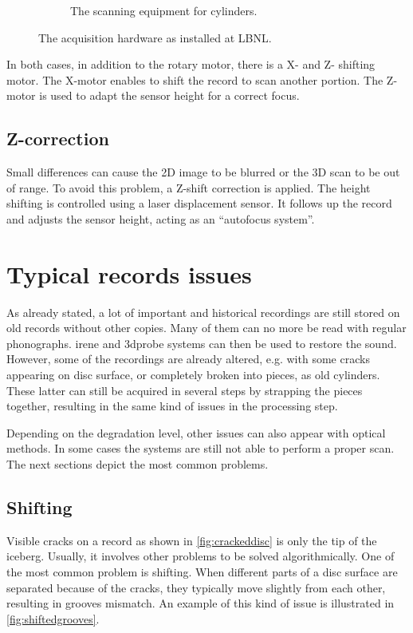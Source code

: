 \begin{figure}[!ht]
\begin{subfigure}[b]{0.49\textwidth}
    \caption{The scanning equipment for cylinders.}
    \label{fig:lab3d}
    \end{subfigure}
    \caption{The acquisition hardware as installed at LBNL.}
    \label{fig:labhw}
\end{figure}

In both cases, in addition to the rotary motor, there is a X- and Z- shifting motor. The X-motor enables to shift the record to scan another portion. The Z-motor is used to adapt the sensor height for a correct focus.

\subsection{Z-correction}
\label{sec:zcorr}

Small differences can cause the 2D image to be blurred or the 3D scan to be out of range. To avoid this problem, a Z-shift correction is applied. The height shifting is controlled using a laser displacement sensor. It follows up the record and adjusts the sensor height, acting as an ``autofocus system''.

\section{Typical records issues}

As already stated, a lot of important and historical recordings are still stored on old records without other copies. Many of them can no more be read with regular phonographs. \gls{irene} and \gls{3dprobe} systems can then be used to restore the sound. However, some of the recordings are already altered, e.g. with some cracks appearing on disc surface, or completely broken into pieces, as old cylinders. These latter can still be acquired in several steps by strapping the pieces together, resulting in the same kind of issues in the processing step.

Depending on the degradation level, other issues can also appear with optical methods. In some cases the systems are still not able to perform a proper scan. The next sections depict the most common problems.

\subsection{Shifting}
\label{sec:issueshift}

Visible cracks on a record as shown in \autoref{fig:crackeddisc} is only the tip of the iceberg. Usually, it involves other problems to be solved algorithmically. One of the most common problem is shifting. When different parts of a disc surface are separated because of the cracks, they typically move slightly from each other, resulting in grooves mismatch. An example of this kind of issue is illustrated in \autoref{fig:shiftedgrooves}.

